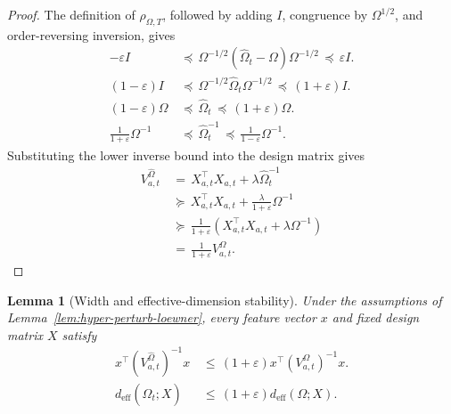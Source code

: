 \documentclass{article} %
\newtheorem{lemma}[theorem]{Lemma}
\begin{document}
\begin{proof}
The definition of \(\rho_{\Omega,T}\), followed by adding \(I\), congruence by
\(\Omega^{1/2}\), and order-reversing inversion, gives
\begin{equation}
\label{eq:hyper-perturb-proof-inv}
\begin{aligned}
-\varepsilon I
&\,\preceq\,
\Omega^{-1/2}
\left(
\widehat{\Omega}_t-\Omega
\right)
\Omega^{-1/2}
\,\preceq\,
\varepsilon I .
\\
(1-\varepsilon)I
&\,\preceq\,
\Omega^{-1/2}\widehat{\Omega}_t\Omega^{-1/2}
\,\preceq\,
(1+\varepsilon)I .
\\
(1-\varepsilon)\Omega
&\,\preceq\,
\widehat{\Omega}_t
\,\preceq\,
(1+\varepsilon)\Omega .
\\
\frac{1}{1+\varepsilon}\Omega^{-1}
&\,\preceq\,
\widehat{\Omega}_t^{-1}
\,\preceq\,
\frac{1}{1-\varepsilon}\Omega^{-1}.
\end{aligned}
\end{equation}
Substituting the lower inverse bound into the design matrix gives
\begin{equation}
\label{eq:hyper-perturb-proof-V}
\begin{aligned}
V_{a,t}^{\widehat{\Omega}}
&\,=\,
X_{a,t}^{\top}X_{a,t}
+\lambda\widehat{\Omega}_t^{-1}
\\
&\,\succeq\,
X_{a,t}^{\top}X_{a,t}
+\frac{\lambda}{1+\varepsilon}\Omega^{-1}
\\
&\,\succeq\,
\frac{1}{1+\varepsilon}
\left(
X_{a,t}^{\top}X_{a,t}
+\lambda\Omega^{-1}
\right)
\\
&\,=\,
\frac{1}{1+\varepsilon}
V_{a,t}^{\Omega}.
\end{aligned}
\end{equation}
\end{proof}

\begin{lemma}[Width and effective-dimension stability]
\label{lem:hyper-perturb-width}
Under the assumptions of Lemma~\ref{lem:hyper-perturb-loewner}, every feature
vector \(x\) and fixed design matrix \(X\) satisfy
\begin{align}
x^\top
\left(V_{a,t}^{\widehat{\Omega}}\right)^{-1}
x
&\,\leq\,
(1+\varepsilon)
x^\top
\left(V_{a,t}^{\Omega}\right)^{-1}
x .
\label{eq:hyper-perturb-width}
\\
d_{\mathrm{eff}}(\widehat{\Omega}_t;X)
&\,\leq\,
(1+\varepsilon)
d_{\mathrm{eff}}(\Omega;X).
\label{eq:hyper-perturb-deff}
\end{align}
\end{lemma}
\end{document}
